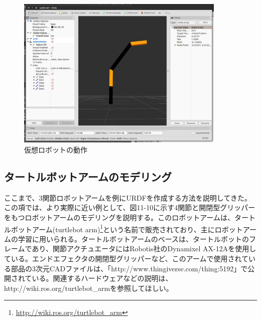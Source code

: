 \begin{figure}[htp]
  \centering
  \includegraphics[width=10cm]{pictures/chapter11/pic_11_09.png}
  \caption{仮想ロボットの動作}
\end{figure}

\subsection{タートルボットアームのモデリング}
ここまで、3関節ロボットアームを例にURDFを作成する方法を説明してきた。この項では、より実際に近い例として、図11-10に示す4関節と開閉型グリッパーをもつロボットアームのモデリングを説明する。このロボットアームは、タートルボットアーム(turtlebot arm)\footnote{\url{http://wiki.ros.org/turtlebot_arm}}という名前で販売されており、主にロボットアームの学習に用いられる。タートルボットアームのベースは、タートルボットのフレームであり、関節アクチュエータにはRobotis社のDynamixel AX-12Aを使用している。エンドエフェクタの開閉型グリッパーなど、このアームで使用されている部品の3次元CADファイルは、「http://www.thingiverse.com/thing:5192」で公開されている。関連するハードウェアなどの説明は、http://wiki.ros.org/turtlebot\_armを参照してほしい。

